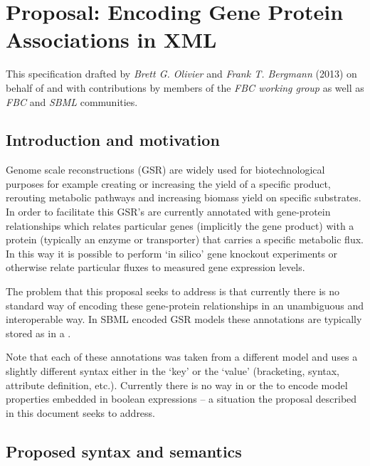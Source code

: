 
\section{Proposal: Encoding Gene Protein Associations in XML}
\label{apdx-gene_association}

This specification drafted by \emph{Brett G. Olivier} and \emph{Frank T. Bergmann} (2013) on behalf of and with contributions by members of the \emph{FBC working group} as well as \emph{FBC} and \emph{SBML} communities.

\subsection{ Introduction and motivation }
\label{intro-ga}

Genome scale reconstructions (GSR) are widely used for biotechnological purposes for example creating or increasing the yield of a specific product, rerouting metabolic pathways and increasing biomass yield on specific substrates. In order to facilitate this GSR's are currently annotated with gene-protein relationships which relates particular genes (implicitly the gene product) with a protein (typically an enzyme or transporter) that carries a specific metabolic flux. In this way it is possible to perform `in silico' gene knockout experiments or otherwise relate particular fluxes to measured gene expression levels.

The problem that this proposal seeks to address is that currently there is no standard way of encoding these gene-protein relationships in an unambiguous and interoperable way. In SBML encoded GSR models these annotations are typically stored as \Notes in a \Reaction.
%

Note that each of these annotations was taken from a different model and uses a slightly different syntax either in the `key' or the `value' (bracketing, syntax, attribute definition, etc.). Currently there is no way in \sbmlthreecore or the \FBCPackage to encode model properties embedded in boolean expressions -- a situation the proposal described in this document seeks to address.

\pagebreak
\subsection{Proposed syntax and semantics}
\label{syntax-ga}

